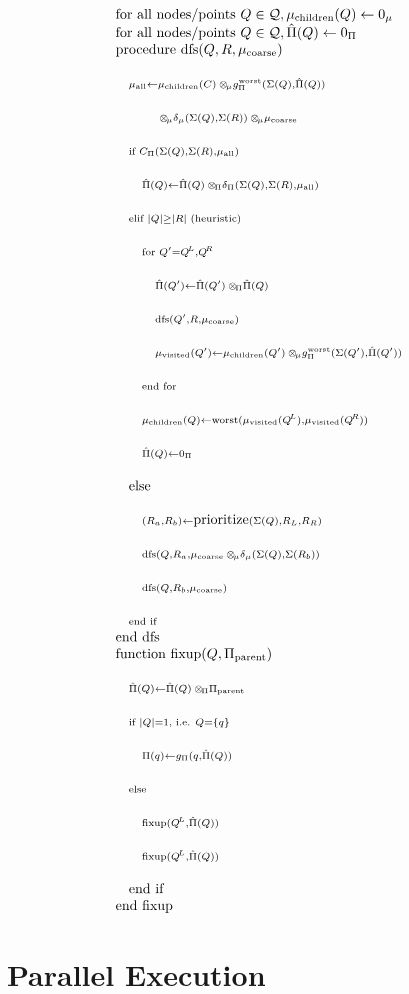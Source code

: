 \documentclass[times, leqno,twocolumn]{article}
\DeclareMathOperator*{\worst}{worst}
\DeclareMathOperator{\dfs}{dfs}
\newcommand{\wholeQ}{\mathcal{Q}}
\newcommand{\x}{\\ \hspace{0.13in} \scriptstyle}
\newcommand{\xx}{\\ \hspace{0.26in} \scriptstyle}
\newcommand{\xxx}{\\ \hspace{0.39in} \scriptstyle}
\newcommand{\kdleft}[1]{#1^{\!L}}
\newcommand{\kdright}[1]{#1^{\!R}}
\newcommand{\myop}[1]{{\scriptstyle\:}\otimes_{\!#1}}
\newcommand{\outpi}{\Pi}
\newcommand{\oppi}{\myop{\outpi}}
\newcommand{\gpi}{g_{\outpi}}
\newcommand{\canprunepi}{C_{\outpi}}
\newcommand{\deltapi}{\delta_{\outpi}}
\newcommand{\gpiworst}{g_{\outpi}^{\worst}}
\newcommand{\outqr}{\Pi}
\newcommand{\inmu}{\mu}
\newcommand{\opmu}{\myop{\mu}}
\newcommand{\deltamu}{\delta_{\mu}}
\newcommand{\muparent}{\inmu_{\text{coarse}}}
\newcommand{\muchild}{\inmu_{\text{children}}}
\newcommand{\muvisit}{\inmu_{\text{visited}}}
\newcommand{\muall}{\inmu_{\text{all}}}
\newcommand{\hatpi}{\hat{\outpi}}
\newcommand{\piparent}{\outpi_{\text{parent}}}
\newcommand{\outstat}{\Sigma}
\begin{document}
\begin{equation*}
  \begin{array}{l}
    \text{for all nodes/points } Q \in \wholeQ, \muchild(Q) \gets 0_{\inmu}
    \\
    \text{for all nodes/points } Q \in \wholeQ, \hatpi(Q) \gets 0_{\outpi}
    \\
    \mbox{procedure dfs}(Q, R, \muparent)
    \\
    \x \muall \gets \muchild(C) \opmu \gpiworst(\outstat(Q), \hatpi(Q))
    \\ \x \qquad \opmu \deltamu(\outstat(Q), \outstat(R)) \opmu \muparent
    \\
    \x \text{if } \canprunepi(\outstat(Q), \outstat(R), \muall)
    \\
    \xx \hatpi(Q) \gets \hatpi(Q) \oppi \deltapi(\outstat(Q), \outstat(R), \muall)
    \\
    \x \text{elif } |Q| \geq |R| \text{ (heuristic)}
    \\
    \xx \text{for } Q' = \kdleft{Q}, \kdright{Q}
    \\
    \xxx \hatpi(Q') \gets \hatpi(Q') \oppi \hatpi(Q)
    \\
    \xxx \text{dfs}(Q', R, \muparent)
    \\
    \xxx \muvisit(Q') \gets \muchild(Q') \opmu \gpiworst(\outstat(Q'), \hatpi(Q'))
    \\
    \xx \text{end for}
    \\
    \xx \muchild(Q) \gets \worst(\muvisit(\kdleft{Q}), \muvisit(\kdright{Q}))
    \\
    \xx \hatpi(Q) \gets 0_{\outpi}
    \\
    \x \mbox{else}
    \\
    \xx (R_a, R_b) \gets \mbox{prioritize}(\outstat(Q), R_L, R_R)
    \\
    \xx \dfs(Q, R_a, \muparent \opmu \deltamu(\outstat(Q), \outstat(R_b))
    \\
    \xx \dfs(Q, R_b, \muparent)
    \\
    \x \text{end if}
    \\
    \text{end dfs}
    \\
    \text{function fixup}(Q, \piparent)
    \\
    \x \hatpi(Q) \gets \hatpi(Q) \oppi \piparent
    \\
    \x \text{if } |Q| = 1 \text{, i.e. } Q = \{q\}
    \\
    \xx \outqr(q) \gets \gpi(q, \hatpi(Q))
    \\
    \x \text{else}
    \\
    \xx \text{fixup}(\kdleft{Q}, \hatpi(Q))
    \\
    \xx \text{fixup}(\kdleft{Q}, \hatpi(Q))
    \\
    \x \mbox{end if}
    \\
    \mbox{end fixup}
  \end{array}
\end{equation*}

\section{Parallel Execution}

\nocite{ex1,ex2}


\end{document}
